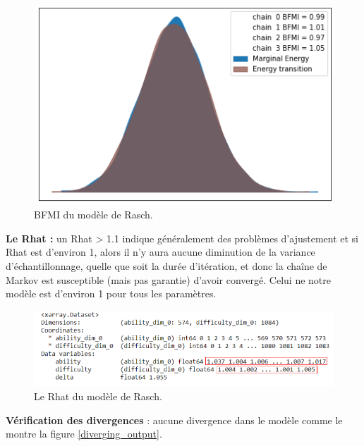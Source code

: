 \begin{figure}[H]
	\begin{center}
		\includegraphics[scale=0.5]{images/chapitre7/model_energy.png}
	\end{center}
	\caption{BFMI du modèle de Rasch.}
	\label{bfmi_of_model}
\end{figure}

\noindent \textbf{Le Rhat :} un Rhat > 1.1 indique généralement des problèmes d'ajustement et si Rhat est d'environ 1, alors il n’y aura aucune diminution de la variance d'échantillonnage, quelle que soit la durée d’itération, et donc la chaîne de Markov est susceptible (mais pas garantie) d'avoir convergé. Celui ne notre modèle est d'environ 1 pour tous les paramètres.

\begin{figure}[H]
	\begin{center}
		\includegraphics[width=\textwidth]{images/chapitre7/output_of_rhat.png}
	\end{center}
	\caption{Le Rhat du modèle de Rasch.}
	\label{output_of_rhat}
\end{figure}

\noindent \textbf{Vérification des divergences }: aucune divergence dans le modèle comme le montre la figure \ref{diverging_output}.

